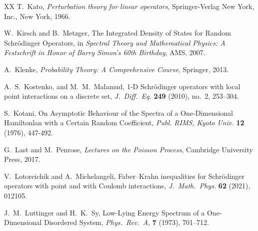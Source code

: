 \documentclass[12pt,a4paper]{article}
\begin{document}
\begin{thebibliography}{XX}
T.\ Kato,
\textit{Perturbation theory for linear operators},
Springer-Verlag New York, Inc., New York, 1966.



W.\ Kirsch and B.\ Metzger,
The Integrated Density of States 
for Random Schr\"odinger Operators,
in \textit{Spectral Theory and Mathematical Physics: 
A Festschrift in Honor of Barry Simon's 60th Birthday},
AMS, 2007.


A.\ Klenke,
\textit{Probability Theory: 
A Comprehensive Course},
Springer, 2013.

A.\ S.\ Kostenko, and M.\ M.\ Malamud,
1-D Schr\"odinger operators with local point interactions on a discrete set,
\textit{J.\ Diff.\ Eq.} \textbf{249} (2010), no.\ 2, 253--304. 



S.\ Kotani,
On Asymptotic Behaviour of the Spectra of 
a One-Dimensional Hamiltonlan with a Certain Random Coefficient,
\textit{Publ. RIMS, Kyoto Univ.} \textbf{12} (1976), 447-492.



G.\ Last and M.\ Penrose,
\textit{Lectures on the Poisson Process},
Cambridge University Press,
2017.


V.\ Lotoreichik and A.\ Michelangeli,
Faber–Krahn inequalities for Schr\"odinger operators 
with point and with Coulomb interactions,
\textit{J.\ Math.\ Phys.} \textbf{62} (2021),
012105.



J.\ M.\ Luttinger and H.\ K.\ Sy,
Low-Lying Energy Spectrum of a One-Dimensional Disordered System,
\textit{Phys.\ Rev.\ A}, \textbf{7} (1973), 701--712.





\end{thebibliography}
\end{document}
